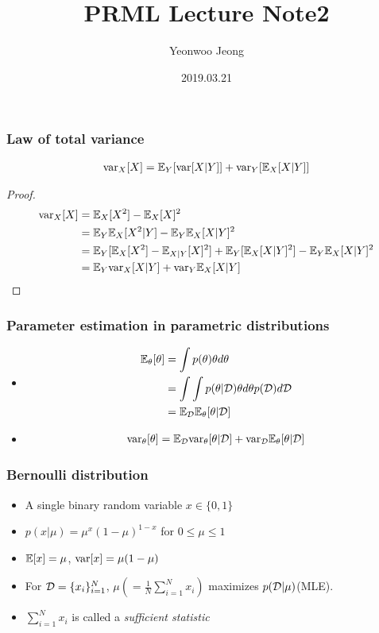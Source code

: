 \documentclass[10pt,mathserif]{beamer}
\title{PRML Lecture Note2}
\author{Yeonwoo Jeong}
\institute
    {Seoul National University}
\date{2019.03.21}
\begin{document}
\begin{frame}
  \titlepage
\end{frame}

\begin{frame}
\frametitle{Law of total variance}
\begin{align}
\mathrm{var}_X[X] = \mathbb{E}_Y[\mathrm{var}[X|Y]] + \mathrm{var}_Y[\mathbb{E}_X[X|Y]] \nonumber
\end{align}
\begin{proof}
\begin{align}
\mathrm{var}_X[X] &= \mathbb{E}_X[X^2] - \mathbb{E}_X[X]^2 \nonumber\\
&= \mathbb{E}_Y\mathbb{E}_X[X^2|Y] - \mathbb{E}_Y \mathbb{E}_{X} [X|Y]^2 \nonumber\\
&= \mathbb{E}_Y[\mathbb{E}_X[X^2] - \mathbb{E}_{X| Y} [X]^2]+\mathbb{E}_Y[\mathbb{E}_X[X|Y]^2] - \mathbb{E}_Y \mathbb{E}_X[X|Y]^2 \nonumber\\
&= \mathbb{E}_Y \mathrm{var}_X[X|Y] + \mathrm{var}_Y\mathbb{E}_X[X|Y] \nonumber
\end{align}
\end{proof}
\end{frame}
\begin{frame}
\frametitle{Parameter estimation in parametric distributions}
\begin{itemize}
\item
\begin{align}
\mathbb{E}_\theta[\theta] &= \int p(\theta) \theta d\theta \nonumber\\
                   &= \int \int p(\theta | \mathcal{D}) \theta d\theta p(\mathcal{D}) d\mathcal{D} \nonumber\\
                   &= \mathbb{E}_{\mathcal{D}}\mathbb{E}_\theta[\theta|\mathcal{D}] \nonumber
\end{align}
\item
\begin{align}
\mathrm{var}_\theta[\theta] = \mathbb{E}_{\mathcal{D}}\mathrm{var}_\theta[\theta|\mathcal{D}] + \mathrm{var}_{\mathcal{D}}\mathbb{E}_\theta[\theta|\mathcal{D}]\nonumber
\end{align}
\end{itemize}
\end{frame}
\begin{frame}
\frametitle{Bernoulli distribution}
\begin{itemize}\itemsep=12pt
\item A single binary random variable $x\in \{0, 1\}$
\item $p(x|\mu) = \mu^x(1-\mu)^{1-x}$ for $0\leq \mu \leq 1$
\item $\mathbb{E}[x] = \mu$, $\mathrm{var}[x] = \mu(1-\mu)$
\item For $\mathcal{D}=\{x_i\}_{i=1}^N$, $\mu(=\frac{1}{N}\sum_{i=1}^N x_i)$  maximizes $p(\mathcal{D}|\mu)$(MLE).
\item $\sum_{i=1}^N x_i$ is called a \textit{sufficient statistic}
\end{itemize}
\end{frame}
\end{document}
